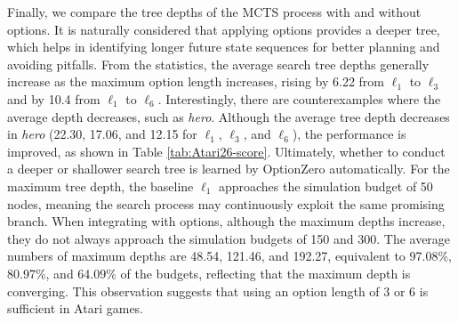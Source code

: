 Finally, we compare the tree depths of the MCTS process with and without options.
It is naturally considered that applying options provides a deeper tree, which helps in identifying longer future state sequences for better planning and avoiding pitfalls.
From the statistics, the average search tree depths generally increase as the maximum option length increases, rising by 6.22 from $\ell_1$ to $\ell_3$ and by 10.4 from $\ell_1$ to $\ell_6$.
Interestingly, there are counterexamples where the average depth decreases, such as \textit{hero}.
Although the average tree depth decreases in \textit{hero} (22.30, 17.06, and 12.15 for $\ell_1$, $\ell_3$, and $\ell_6$), the performance is improved, as shown in Table \ref{tab:Atari26-score}.
Ultimately, whether to conduct a deeper or shallower search tree is learned by OptionZero automatically.
For the maximum tree depth, the baseline $\ell_1$ approaches the simulation budget of 50 nodes, meaning the search process may continuously exploit the same promising branch.
When integrating with options, although the maximum depths increase, they do not always approach the simulation budgets of 150 and 300.
The average numbers of maximum depths are 48.54, 121.46, and 192.27, equivalent to 97.08\%, 80.97\%, and 64.09\% of the budgets, reflecting that the maximum depth is converging.
This observation suggests that using an option length of 3 or 6 is sufficient in Atari games.

